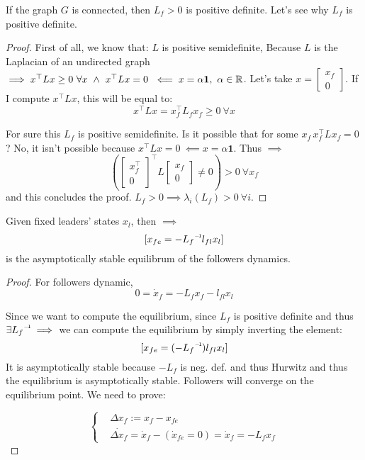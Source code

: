 \begin{lemma}
If the graph $G$ is connected, then $L_f > 0$ is positive definite. Let's see why $L_f$ is positive definite.
\end{lemma}

\begin{proof}
First of all, we know that: $L$ is positive semidefinite, Because $L$ is the Laplacian of an undirected graph $\implies x^\top Lx \geq 0\ \forall x\ \land\ x^\top Lx = 0\ \impliedby x=\alpha\mathbf{1},\ \alpha\in\mathbb{R}$. Let's take $x=\begin{bmatrix}x_f\\0\end{bmatrix}$. If I compute $x^\top Lx$, this will be equal to:
\[
	x^\top Lx = x^\top_fL_fx_f \geq 0\ \forall x
\]

For sure this $L_f$ is positive semidefinite. Is it possible that for some $x_f\, x^\top_fLx_f=0$? No, it isn't possible because $x^\top Lx = 0\ \impliedby x=\alpha\mathbf{1}$. Thus $\implies$ 
\[
	(\begin{bmatrix}x_f^\top\\0\end{bmatrix}^\top L\begin{bmatrix}x_f\\0\end{bmatrix} \neq 0) > 0\ \forall x_f
\]
and this concludes the proof. $L_f > 0 \implies \lambda_i(L_f) > 0\ \forall i$.
\end{proof}

\begin{lemma}
Given fixed leaders' states $x_l$, then $\implies$
\[
	[x_{fe} = -\inv{L_f}l_{fl}x_l]
\]
is the asymptotically stable equilibrum of the followers dynamics.
\end{lemma}

\begin{proof}
For followers dynamic,
\[
	0 = \dot{x}_f = -L_fx_f -l_{fl}x_l
\]

Since we want to compute the equilibrium, since $L_f$ is positive definite and thus $\exists \inv{L_f} \implies$ we can compute the equilibrium by simply inverting the element:
\[
	[x_{fe} = (-\inv{L_f})l_{fl}x_l]
\]
It is asymptotically stable because $-L_f$ is neg. def. and thus Hurwitz and thus the equilibrium is asymptotically stable. Followers will converge on the equilibrium point. We need to prove:

\[
	\left\{
	\begin{aligned}
	&\Delta x_f := x_f - x_{fe}\\
	&\dot{\Delta x_f} = \dot{x}_f - (\dot{x}_{fe} = 0) = \dot{x}_f = -L_fx_f
	\end{aligned}
	\right.
\]
\end{proof}

